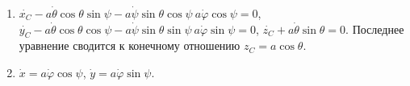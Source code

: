 \begin{enumerate}
\item $\dot{x_C} - a\dot{\theta}\cos{\theta}\sin{\psi} -
a\dot{\psi}\sin{\theta}\cos{\psi} \ a\dot{\varphi}\cos{\psi} = 0$,
$\dot{y_C} - a\dot{\theta}\cos{\theta}\cos{\psi} -
a\dot{\psi}\sin{\theta}\sin{\psi} \ a\dot{\varphi}\sin{\psi} = 0$,
$\dot{z_C} + a\dot{\theta}\sin{\theta} = 0$.
Последнее уравнение сводится к конечному отношению $z_C = a\cos{\theta}$.
\item $\dot{x} = a\dot{\varphi}\cos{\psi}$,
$\dot{y} = a\dot{\varphi}\sin{\psi}$.
\end{enumerate}

